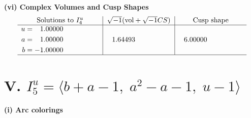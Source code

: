 \documentclass[1p]{elsarticle_modified}
\theoremstyle{definition}
\newcommand{\I}{\sqrt{-1}}
\begin{document}
\newpage\flushleft \textbf{(vi) Complex Volumes and Cusp Shapes}
$$\begin{array}{c|c|c}  
\text{Solutions to }I^u_{4}& \I (\text{vol} + \sqrt{-1}CS) & \text{Cusp shape}\\
 \hline 
\begin{aligned}
u &= \phantom{-}1.00000\phantom{ +0.000000I} \\
a &= \phantom{-}1.00000\phantom{ +0.000000I} \\
b &= -1.00000\phantom{ +0.000000I}\end{aligned}
 & \phantom{-}1.64493\phantom{ +0.000000I} & \phantom{-}6.00000\phantom{ +0.000000I}\\
 \hline 
 \end{array}$$\newpage\newpage\renewcommand{\arraystretch}{1}
\centering \section*{V. $I^u_{5}= \langle b+a-1,\;a^2- a-1,\;u-1 \rangle$}
\flushleft \textbf{(i) Arc colorings}\\
\end{document}
